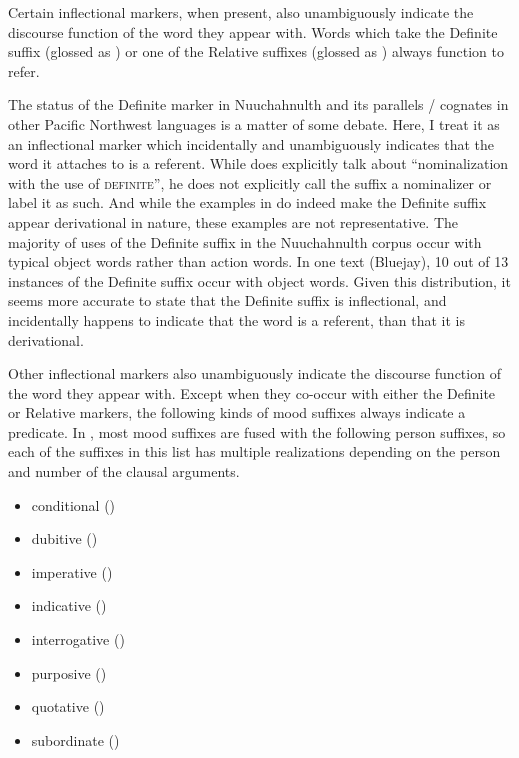 Certain inflectional markers, when present, also unambiguously indicate the discourse function of the word they appear with. Words which take the Definite suffix  (glossed as ) or one of the Relative suffixes (glossed as ) always function to refer.

The status of the Definite marker in Nuuchahnulth and its parallels / cognates in other Pacific Northwest languages is a matter of some debate. Here, I treat it as an inflectional marker which incidentally and unambiguously indicates that the word it attaches to is a referent. While \textcite[48]{Nakayama2001} does explicitly talk about \enquote{nominalization with the use of  \textsc{definite}}, he does not explicitly call the suffix a nominalizer or label it as such. And while the examples in \textcite[48]{Nakayama2001} do indeed make the Definite suffix appear derivational in nature, these examples are not representative. The majority of uses of the Definite suffix in the Nuuchahnulth corpus occur with typical object words rather than action words. In one text (Bluejay), 10 out of 13 instances of the Definite suffix occur with object words. Given this distribution, it seems more accurate to state that the Definite suffix is inflectional, and incidentally happens to indicate that the word is a referent, than that it is derivational.

Other inflectional markers also unambiguously indicate the discourse function of the word they appear with. Except when they co-occur with either the Definite or Relative markers, the following kinds of mood suffixes always indicate a predicate. In , most mood suffixes are fused with the following person suffixes, so each of the suffixes in this list has multiple realizations depending on the person and number of the clausal arguments.

\begin{itemize}
  \singlespacing
  \item conditional ()
  \item dubitive ()
  \item imperative ()
  \item indicative ()
  \item interrogative ()
  \item purposive ()
  \item quotative ()
  \item subordinate ()
\end{itemize}

